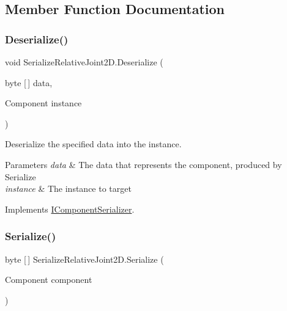 \subsection{Member Function Documentation}
\mbox{\label{class_serialize_relative_joint2_d_a48e35c8c7fa333d24579df5f00128a50}} 
\subsubsection{\texorpdfstring{Deserialize()}{Deserialize()}}
{\footnotesize\ttfamily void Serialize\+Relative\+Joint2\+D.\+Deserialize (\begin{DoxyParamCaption}\item[{byte \mbox{[}$\,$\mbox{]}}]{data,  }\item[{Component}]{instance }\end{DoxyParamCaption})\hspace{0.3cm}{\ttfamily [inline]}}



Deserialize the specified data into the instance. 


\begin{DoxyParams}{Parameters}
{\em data} & The data that represents the component, produced by Serialize \\
\hline
{\em instance} & The instance to target \\
\hline
\end{DoxyParams}


Implements \hyperlink{interface_i_component_serializer_a4cc366a5c78b33d47a90c209d8fed883}{I\+Component\+Serializer}.

\mbox{\label{class_serialize_relative_joint2_d_a4769d5255430ffa12107acdc03a2e73a}} 
\subsubsection{\texorpdfstring{Serialize()}{Serialize()}}
{\footnotesize\ttfamily byte \mbox{[}$\,$\mbox{]} Serialize\+Relative\+Joint2\+D.\+Serialize (\begin{DoxyParamCaption}\item[{Component}]{component }\end{DoxyParamCaption})\hspace{0.3cm}{\ttfamily [inline]}}



